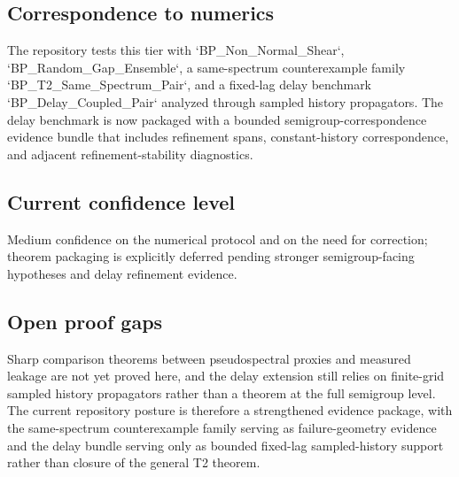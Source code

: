 \subsection{Correspondence to numerics}
The repository tests this tier with `BP_Non_Normal_Shear`, `BP_Random_Gap_Ensemble`, a same-spectrum counterexample family `BP_T2_Same_Spectrum_Pair`, and a fixed-lag delay benchmark `BP_Delay_Coupled_Pair` analyzed through sampled history propagators. The delay benchmark is now packaged with a bounded semigroup-correspondence evidence bundle that includes refinement spans, constant-history correspondence, and adjacent refinement-stability diagnostics.

\subsection{Current confidence level}
Medium confidence on the numerical protocol and on the need for correction; theorem packaging is explicitly deferred pending stronger semigroup-facing hypotheses and delay refinement evidence.

\subsection{Open proof gaps}
Sharp comparison theorems between pseudospectral proxies and measured leakage are not yet proved here, and the delay extension still relies on finite-grid sampled history propagators rather than a theorem at the full semigroup level. The current repository posture is therefore a strengthened evidence package, with the same-spectrum counterexample family serving as failure-geometry evidence and the delay bundle serving only as bounded fixed-lag sampled-history support rather than closure of the general T2 theorem.
